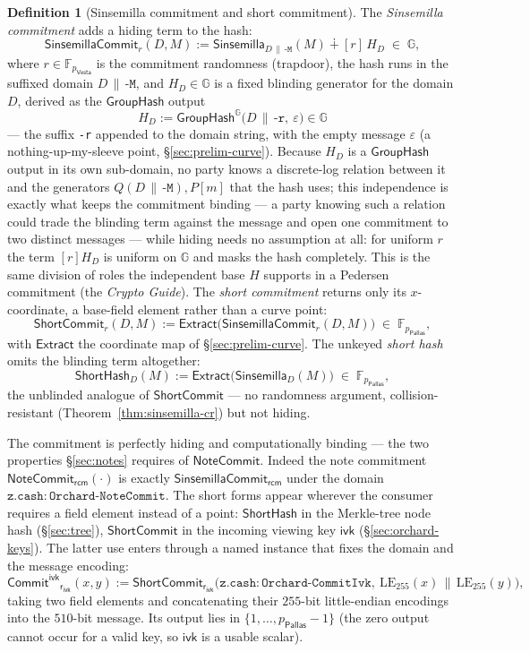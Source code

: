 \documentclass[11pt,a4paper]{article}
\theoremstyle{definition}
\newtheorem{definition}[theorem]{Definition}
\newcommand{\F}{\mathbb{F}}
\newcommand{\G}{\mathbb{G}}
\newcommand{\Pallas}{\ensuremath{\mathsf{Pallas}}}
\newcommand{\Vesta}{\ensuremath{\mathsf{Vesta}}}
\newcommand{\NoteCommit}{\ensuremath{\mathsf{NoteCommit}}}
\newcommand{\Sinsemilla}{\ensuremath{\mathsf{Sinsemilla}}}
\newcommand{\ShortCommit}{\ensuremath{\mathsf{ShortCommit}}}
\newcommand{\CommitIvk}{\ensuremath{\mathsf{Commit}^{\mathsf{ivk}}}}
\newcommand{\Extract}{\ensuremath{\mathsf{Extract}}}
\newcommand{\GroupHash}{\ensuremath{\mathsf{GroupHash}}}
\newcommand{\ivk}{\ensuremath{\mathsf{ivk}}}
\newcommand{\rcm}{\ensuremath{\mathsf{rcm}}}
\newcommand{\rivk}{\ensuremath{\mathsf{r_{ivk}}}}
\begin{document}
\begin{definition}[Sinsemilla commitment and short commitment]\label{def:sinsemilla-commit}
The \emph{Sinsemilla commitment} adds a hiding term to the hash:
\[
\mathsf{SinsemillaCommit}_r(D, M) := \Sinsemilla_{D \,\|\, \texttt{-M}}(M) \dotplus [r]\,H_D \;\in\; \G,
\]
where $r \in \F_{p_{\Vesta}}$ is the commitment randomness (trapdoor), the
hash runs in the suffixed domain $D \,\|\, \texttt{-M}$, and $H_D \in \G$ is
a fixed blinding generator for the domain $D$, derived as the $\GroupHash$
output
\[
H_D := \GroupHash^{\G}\bigl(D \,\|\, \texttt{-r},\ \varepsilon\bigr) \in \G
\]
--- the suffix \texttt{-r} appended to the domain string, with the empty
message $\varepsilon$ (a nothing-up-my-sleeve point, \S\ref{sec:prelim-curve}). Because $H_D$ is
a $\GroupHash$ output in its own sub-domain, no party knows a discrete-log relation between it and
the generators $Q(D \,\|\, \texttt{-M}), P[m]$ that the hash uses; this independence is
exactly what keeps the commitment binding --- a party knowing such a relation
could trade the blinding term against the message and open one commitment to
two distinct messages --- while hiding needs no assumption at all: for
uniform $r$ the term $[r]H_D$ is uniform on $\G$ and masks the hash
completely. This is the same division of roles the independent base $H$
supports in a Pedersen commitment (the \emph{Crypto Guide}). The \emph{short commitment} returns only
its $x$-coordinate, a base-field element rather than a curve point:
\[
\ShortCommit_r(D, M) := \Extract\bigl(\mathsf{SinsemillaCommit}_r(D, M)\bigr) \;\in\; \F_{p_{\Pallas}},
\]
with $\Extract$ the coordinate map of \S\ref{sec:prelim-curve}. The unkeyed
\emph{short hash} omits the blinding term altogether:
\[
\mathsf{ShortHash}_D(M) := \Extract\bigl(\Sinsemilla_D(M)\bigr) \;\in\; \F_{p_{\Pallas}},
\]
the unblinded analogue of $\ShortCommit$ --- no randomness argument,
collision-resistant (Theorem~\ref{thm:sinsemilla-cr}) but not hiding.
\end{definition}

The commitment is perfectly hiding and computationally binding --- the two
properties §\ref{sec:notes} requires of $\NoteCommit$. Indeed the note
commitment $\NoteCommit_{\rcm}(\cdot)$ is exactly
$\mathsf{SinsemillaCommit}_{\rcm}$ under the domain
$\mathtt{z.cash:Orchard\text{-}NoteCommit}$. The short forms appear wherever the
consumer requires a field element instead of a point: $\mathsf{ShortHash}$ in
the Merkle-tree node hash (\S\ref{sec:tree}), $\ShortCommit$ in the incoming
viewing key $\ivk$ (\S\ref{sec:orchard-keys}). The latter use enters through
a named instance that fixes the domain and the message encoding:
\[
\CommitIvk_{\rivk}(x, y) := \ShortCommit_{\rivk}\bigl(\mathtt{z.cash:Orchard\text{-}CommitIvk},\ \mathrm{LE}_{255}(x) \,\|\, \mathrm{LE}_{255}(y)\bigr),
\]
taking two field elements and concatenating their $255$-bit little-endian
encodings into the $510$-bit message. Its output lies in
$\{1, \dots, p_{\Pallas}-1\}$ (the zero output cannot occur for a valid key,
so $\ivk$ is a usable scalar).
\end{document}
